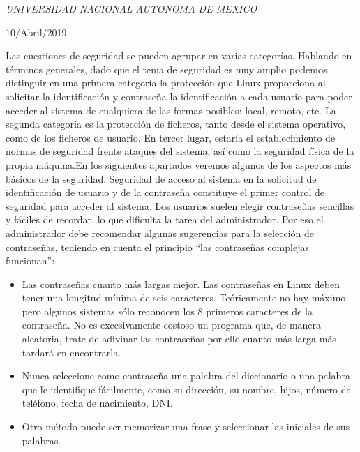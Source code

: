 \documentclass[a4paper, 11pt, oneside]{article}
\begin{document}
\begin{titlepage}
	\textit{UNIVERSIDAD NACIONAL AUTONOMA DE MEXICO} 
	
	\vfill
	
	
	
	
	\vspace{0.3\baselineskip} 
	
	10/Abril/2019 
	
	

\end{titlepage}
Las cuestiones de seguridad se pueden agrupar en varias categorías. Hablando en términos generales, dado que el tema de seguridad es muy amplio podemos distinguir en una primera categoría la protección que Linux proporciona al solicitar la identificación y contraseña la identificación a cada usuario para poder acceder al sistema de cualquiera de las formas posibles: local, remoto, etc. La segunda categoría es la protección de ficheros, tanto desde el sistema operativo, como de los ficheros de usuario. En tercer lugar, estaría el establecimiento de normas de seguridad frente ataques del sistema, así como la seguridad física de la propia máquina.En los siguientes apartados veremos algunos de los aspectos más básicos de la seguridad. Seguridad de acceso al sistema en la solicitud de identificación de usuario y de la contraseña constituye el primer control de seguridad para acceder al sistema. Los usuarios suelen elegir contraseñas sencillas y fáciles de recordar, lo que dificulta la tarea del administrador. Por eso el administrador debe recomendar algunas sugerencias para la selección de contraseñas, teniendo en cuenta el principio “las contraseñas complejas funcionan”:
\begin{itemize}
    \item Las contraseñas cuanto más largas mejor. Las contraseñas en Linux deben tener una longitud mínima de seis caracteres. Teóricamente no hay máximo pero algunos sistemas sólo reconocen los 8 primeros caracteres de la contraseña. No es excesivamente costoso un programa que, de manera aleatoria, trate de adivinar las contraseñas por ello cuanto más larga más tardará en encontrarla.
    \item Nunca seleccione como contraseña una palabra del diccionario o una palabra que le identifique fácilmente, como su dirección, su nombre, hijos, número de teléfono, fecha de nacimiento, DNI.
    \item Otro método puede ser memorizar una frase y seleccionar las iniciales de sus palabras.
\end{itemize}
\end{document}
